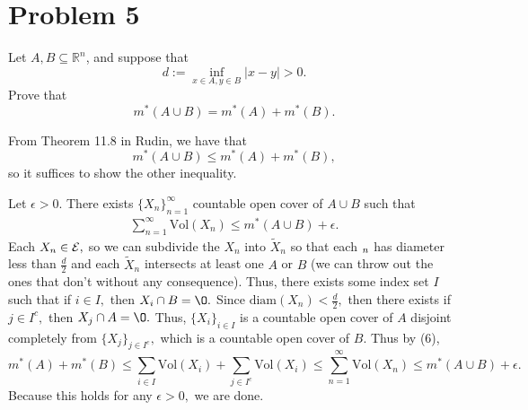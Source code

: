 \documentclass[11pt]{article}
\newcommand{\Vol}{\text{Vol}}
\renewcommand{\emptyset}{\O}
\begin{document}
\section*{Problem 5}
\begin{problem}
    Let $A, B \subseteq \mathbb{R}^n$, and suppose that
\[
d := \inf_{x \in A, y \in B} |x - y| > 0.
\]
Prove that
\[
m^*(A \cup B) = m^*(A) + m^*(B).
\]
\end{problem}
\begin{solution}
    From Theorem 11.8 in Rudin, we have that 
    \[m^*(A \cup B) \leq m^*(A) + m^*(B),\] so it suffices to show the other inequality.

    Let $\epsilon>0.$ There exists $\{X_n\}_{n=1}^\infty$ countable open cover of $A\cup B$ such that
    \begin{align}
    \sum_{n=1}^\infty \Vol(X_n) \leq m^*(A \cup B) + \epsilon.    
    \end{align}
    Each $X_n \in \cal E,$ so we can subdivide the $X_n$ into $\tilde{X}_n$ so that each $\title{X}_n$ has diameter less than $\frac{d}{2}$ and each $\tilde{X}_n$ intersects at least one $A$ or $B$ (we can throw out the ones that don't without any consequence). Thus, there exists some index set $I$ such that if $i \in I,$ then $X_i \cap B = \emptyset.$ Since $\text{diam}(X_n) <\frac{d}{2},$ then  there exists if $j \in I^c,$ then $X_j \cap A = \emptyset.$ Thus, $\{X_i\}_{i \in I}$ is a countable open cover of $A$ disjoint completely from $\{X_j\}_{j \in I^c},$ which is a countable open cover of $B.$ Thus by (6), 
    \[m^*(A) + m^*(B) \leq \sum_{i \in I} \Vol(X_i) + \sum_{j \in I^c} \Vol(X_i) \leq \sum_{n=1}^\infty \Vol(X_n) \leq m^*(A \cup B) + \epsilon.\] Because this holds for any $\epsilon>0,$ we are done.
\end{solution}

\newpage
\end{document}
